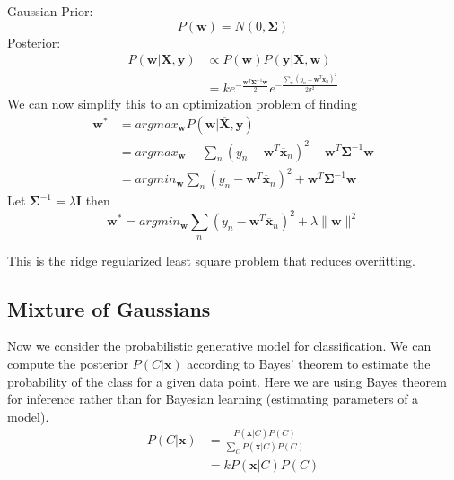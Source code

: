 \documentclass[12pt]{article}
\begin{document}
            Gaussian Prior:
            $$ P(\boldsymbol{w}) = N(0, \boldsymbol{\Sigma}) $$
            Posterior:
            \begin{align*}
                P(\boldsymbol{w} | \boldsymbol{X}, \boldsymbol{y}) &\propto P(\boldsymbol{w})P(\boldsymbol{y}|\boldsymbol{X}, \boldsymbol{w}) \\
                &= ke^{-\frac{\boldsymbol{w}^T\boldsymbol{\Sigma}^{-1}\boldsymbol{w}}{2}} e^{-\frac{\sum_n(y_n - \boldsymbol{w}^T\boldsymbol{x}_n)^2}{2\sigma^2}}
            \end{align*}
            We can now simplify this to an optimization problem of finding
            \begin{align*}
                \boldsymbol{w}^* &= argmax_{\boldsymbol{w}}P(\boldsymbol{w}|\overline{\boldsymbol{X}}, \boldsymbol{y}) \\
                &= argmax_{\boldsymbol{w}} - \sum_{n} (y_n - \boldsymbol{w}^T\overline{\boldsymbol{x}}_n)^2 - \boldsymbol{w}^T \boldsymbol{\Sigma}^{-1}\boldsymbol{w} \\
                &= argmin_{\boldsymbol{w}} \sum_{n} (y_n - \boldsymbol{w}^T \overline{\boldsymbol{x}}_n)^2 + \boldsymbol{w}^T \boldsymbol{\Sigma}^{-1}\boldsymbol{w}
            \end{align*}
            Let $\boldsymbol{\Sigma}^{-1} = \lambda \boldsymbol{I}$ then
            $$ \boldsymbol{w}^* = argmin_{\boldsymbol{w}} \sum_{n} (y_n - \boldsymbol{w}^T \overline{\boldsymbol{x}}_n)^2 + \lambda \|\boldsymbol{w}\|^2 $$

            This is the ridge regularized least square problem that reduces overfitting.

    \subsection{Mixture of Gaussians}
        Now we consider the probabilistic generative model for classification. We can compute the posterior $P(C|\boldsymbol{x})$ according to Bayes' theorem to estimate the probability of the class for a given data point. Here we are using
        Bayes theorem for inference rather than for Bayesian learning (estimating parameters of a model).
        \begin{align*}
            P(C|\boldsymbol{x}) &= \frac{P(\boldsymbol{x}|C)P(C)}{\sum_C P(\boldsymbol{x}|C)P(C)} \\
            &= k P(\boldsymbol{x}|C)P(C)
        \end{align*}
\end{document}
